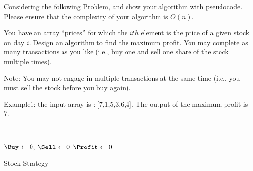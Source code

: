 \begin{exercise}[]{Considering the following Problem, and show your algorithm with pseudocode. Please ensure that the complexity of your algorithm is $O(n)$.


  You have an array “prices” for which the $ith$ element is the price of a given stock on day $i$. Design an algorithm to find the maximum profit. You may complete as many transactions as you like (i.e., buy one and sell one share of the stock multiple times).
  
  Note: You may not engage in multiple transactions at the same time (i.e., you must sell the stock before you buy again).
  
  Example1: the input array is : [7,1,5,3,6,4]. The output of the maximum profit is 7.}
  \begin{solution}
  
    \par{~}

  \begin{algorithm}[H]
    \BlankLine
    $\Buy \leftarrow 0$, $\Sell \leftarrow 0$ \;
    $\Profit \leftarrow 0$ \;
    \caption{Stock Strategy\label{stock}}
  \end{algorithm}
  \end{solution}
  \label{ex2}
\end{exercise}



